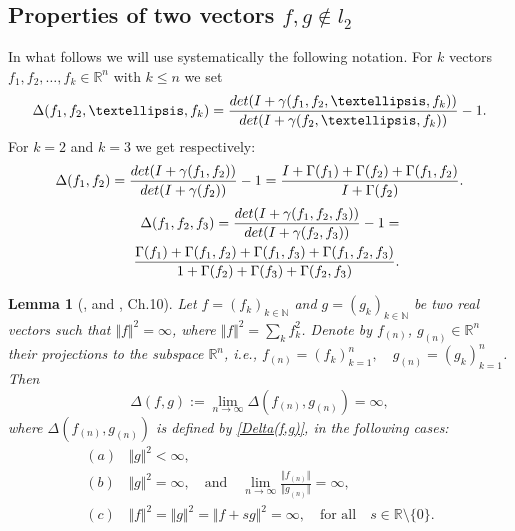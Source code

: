\documentclass[preprint,12pt]{elsarticle}
\newtheorem{lem}[thm]{Lemma}
\numberwithin{equation}{section}
\begin{document}
\subsection{Properties of  two vectors $f,g\not\in l_2$}
In what follows we will use systematically the following notation. 
For $k$ vectors $f_1,f_2,\dots,f_k\in \mathbb R^n$ with $k\leq n$ we set
\begin{equation}
\label{Delta(f(1),...,f(k)).1}
\Delta(f_1,f_2,\dots,f_k)=
\frac{{\rm det}(I+\gamma(f_1,f_2,\dots,f_k))}{{\rm det}(I+\gamma(f_2,\dots,f_k))}-1.
\end{equation}
%
For $k=2$ and $k=3$ we get respectively:
\begin{equation}
\label{Delta(f,g)}
\Delta(f_1,f_2)=\frac{{\rm det}(I+\gamma(f_1,f_2))}{{\rm det}(I+\gamma(f_2))}-1
=\frac{I+\Gamma(f_1)+\Gamma(f_2)+\Gamma(f_1,f_2)}{I+\Gamma(f_2)}.
\end{equation}
%
\begin{eqnarray}
 \label{Delta(f,g,h)}
&&\Delta(f_1,f_2,f_3)=\frac{{\rm det}(I+\gamma(f_1,f_2,f_3))}{{\rm det}(I+\gamma(f_2,f_3))}-1
=\\
\nonumber
&&\frac{\Gamma(f_1)+\Gamma(f_1,f_2)+\Gamma(f_1,f_3)+\Gamma(f_1,f_2,f_3)}{1+\Gamma(f_2)+\Gamma(f_3)+\Gamma(f_2,f_3)}.
\end{eqnarray}
\begin{lem} [\cite{KosJFA17}, and  \cite{Kos_B_09}, Ch.10]
\label{l.min=proj0}
Let $f=(f_k)_{k\in{\mathbb N}}$ and $g=(g_k)_{k\in{\mathbb N}}$ be two real vectors  such that
$\Vert f\Vert^2=\infty$,  where $\Vert f\Vert^2=\sum_kf_k^2$.  Denote by $f_{(n)}$,
$g_{(n)}\in {\mathbb R}^n$ their projections to the subspace
${\mathbb R}^n$, i.e., $f_{(n)}=(f_k)_{k=1}^n,\quad  g_{(n)}=(g_k)_{k=1}^n$. Then
%
\begin{equation}
\label{Delta-to-infty}
\Delta(f,g):=
\lim_{n\to\infty}\Delta(f_{(n)},g_{(n)})=\infty,
\end{equation}
where $\Delta(f_{(n)},g_{(n)})$ is defined by \eqref{Delta(f,g)}, 
in the following cases:
\begin{eqnarray*}
(a)&\Vert g\Vert^2<\infty,\\
(b)&\Vert g\Vert^2=\infty,\quad\text{and}\quad  \lim_{n\to\infty}\frac{\Vert f_{(n)}\Vert}{\Vert g_{(n)}\Vert}=\infty,\\
(c)&\Vert f\Vert^2=\Vert g\Vert^2=\Vert f+s g\Vert^2=\infty,\quad\text{for all}\quad
     s\in {\mathbb R}\setminus\{0\}.
\end{eqnarray*}
\end{lem}
\end{document}
